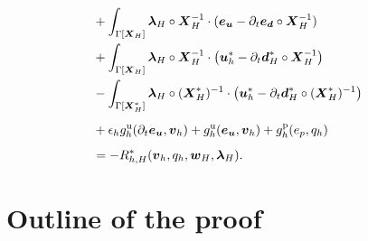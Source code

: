 \documentclass[11pt,reqno]{amsart}
\theoremstyle{definition}
\theoremstyle{plain}
\numberwithin{theorem}{section}
\numberwithin{proposition}{section}
\numberwithin{lemma}{section}
\numberwithin{equation}{section}
\newcommand{\bs}[1]{\boldsymbol{#1}}
\newcommand{\uu}[1]  {{\bs{#1}} }
\newcommand{\dep}{{{\bs{d}}}}
\newcommand{\bv}{{\bs v}}
\newcommand{\bu}{\uu{u}}
\renewcommand{\(}{\bigl(}
\renewcommand{\)}{\bigr)}
\begin{document}
\begin{subequations}
\begin{align}
\label{error-eq-l}\\
& + \int_{\Gamma[\bs X_H]} \bs \lambda_H \circ{\bs X}_H^{-1}\cdot ( {\bs e}_{\bs u} - \partial_t{\bs e}_\dep \circ{\bs X}_H^{-1} ) \label{error-eq-m}\\
& + \int_{\Gamma[\bs X_H]} \bs \lambda_H \circ{\bs X}_H^{-1} \cdot \big( \bu_h^*  - \partial_t{\bs d}_H^* \circ{\bs X}_H^{-1} \big) \notag\\
& - \int_{\Gamma[\bs X_H^*]} \bs \lambda_H \circ({\bs X}_H^*)^{-1}\cdot \big( \bu_h^* - \partial_t{\bs d}_H^* \circ({\bs X}_H^*)^{-1}\big) \label{error-eq-n}\\[5pt] 
& + \epsilon_h g_h^{\rm u}(\partial_t{\bs e}_{\bs u},{\bs v}_h)  + g_h^{\rm u} ({\bs e}_{\bs u},\bv_h ) + g_h^{\rm p} (e_p,q_h ) \label{error-eq-o}\\[5pt]
& = - R_{h,H}^*({\bs v}_h, q_h, \bs w_H, \bs \lambda_H) . \label{error-eq-p} 
\end{align}
\end{subequations}

\section{Outline of the proof}\label{section:outline}
\end{document}
